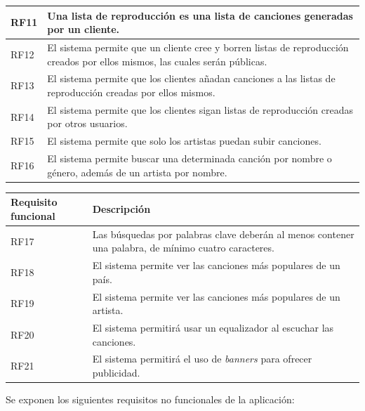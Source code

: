 \documentclass{article}
\begin{document}
\begin{table}[H]
\begin{tabular}{p{4cm} p{10cm}}
		\hline
		RF11
		& Una lista de reproducción es una lista de canciones generadas por un cliente. \\ 
		\hline
		RF12
		& El sistema permite que un cliente cree y borren listas de reproducción creados por ellos mismos, las cuales serán públicas. \\ 
		\hline
		RF13
		& El sistema permite que los clientes añadan canciones a las listas de reproducción creadas por ellos mismos. \\ 
		\hline
		RF14
		& El sistema permite que los clientes sigan listas de reproducción creadas por otros usuarios. \\ 
		\hline
		RF15
		& El sistema permite que solo los artistas puedan subir canciones. \\ 
		\hline
		RF16
		& El sistema permite buscar una determinada canción por nombre o género, además de un artista por nombre. \\ 
		\hline
	\end{tabular}
\end{table}
\break
\begin{table}[H]
	\begin{tabular}{p{4cm} p{10cm}}
		\hline
		\hline 
		\textbf{Requisito funcional}
		\vspace{0.5mm} & \textbf{Descripción} \\ 
		\hline
		\hline
		RF17
		& Las búsquedas por palabras clave deberán al menos contener una palabra, de mínimo cuatro caracteres. \\ 
		\hline 
		RF18
		& El sistema permite ver las canciones más populares de un país. \\ 
		\hline 
		RF19
		& El sistema permite ver las canciones más populares de un artista. \\ 
		\hline
		RF20
		& El sistema permitirá usar un equalizador al escuchar las canciones. \\ 
		\hline
		RF21
		& El sistema permitirá el uso de \textit{banners} para ofrecer publicidad. \\ 
		\hline
	\end{tabular}
\end{table}
Se exponen los siguientes requisitos no funcionales de la aplicación:
\end{document}
